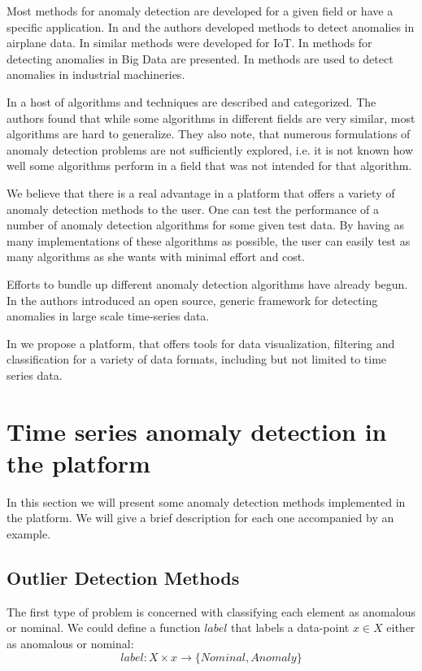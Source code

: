 \documentclass{article}
\begin{document}
Most methods for anomaly detection are developed for a given field or have a specific application. In \cite{nnfd1994} and \cite{MMAD2006} the authors developed methods to detect anomalies in airplane data. In \cite{ghad2018} similar methods were developed for IoT. In \cite{ADDSCIL} methods for detecting anomalies in Big Data are presented. In \cite{NDTSDII1996} methods are used to detect anomalies in industrial machineries.

In \cite{outlierSurvey2014} a host of algorithms and techniques are described and categorized. The authors found that while some algorithms in different fields are very similar, most algorithms are hard to generalize. They also note, that numerous formulations of anomaly detection problems are not sufficiently explored, i.e. it is not known how well some algorithms perform in a field that was not intended for that algorithm.

We believe that there is a real advantage in a platform that offers a variety of anomaly detection methods to the user. One can test the performance of a number of anomaly detection algorithms for some given test data. By having as many implementations of these algorithms as possible, the user can easily test as many algorithms as she wants with minimal effort and cost.

Efforts to bundle up different anomaly detection algorithms have already begun. In \cite{egads2015} the authors introduced an open source, generic framework for detecting anomalies in large scale time-series data.

In \cite{tpad2018} we propose a platform, that offers tools for data visualization, filtering and classification for a variety of data formats, including but not limited to time series data.

\section{Time series anomaly detection in the platform \label{methods}}

In this section we will present some anomaly detection methods implemented in the platform. We will give a brief description for each one accompanied by an example.

\subsection{Outlier Detection Methods}

The first type of problem is concerned with classifying each element as anomalous or nominal. We could define a function $label$ that labels a data-point $x \in X$ either as anomalous or nominal:
$$
    label: X \times x \rightarrow \{Nominal, Anomaly\}
$$
\end{document}
